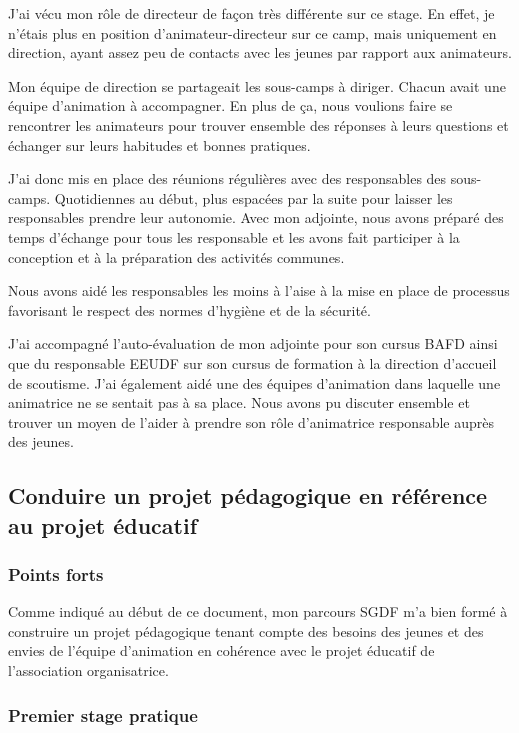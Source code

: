 \documentclass[titlepage,11pt,a4paper]{article}
\begin{document}
J'ai vécu mon rôle de directeur de façon très différente sur ce stage. En effet,
je n'étais plus en position d’animateur-directeur sur ce camp, mais uniquement en
direction, ayant assez peu de contacts avec les jeunes par rapport aux animateurs.

Mon équipe de direction se partageait les sous-camps à diriger. Chacun avait une équipe
d'animation à accompagner. En plus de ça, nous voulions faire se rencontrer les animateurs pour
trouver ensemble des réponses à leurs questions et échanger sur leurs habitudes et bonnes
pratiques.

J'ai donc mis en place des réunions régulières avec des responsables des sous-camps.
Quotidiennes au début, plus espacées par la suite pour laisser les responsables prendre leur autonomie.
Avec mon adjointe, nous avons préparé des temps d'échange pour tous les responsable et les
avons fait participer à la conception et à la préparation des activités communes.

Nous avons aidé les responsables les moins à l'aise à
la mise en place de processus favorisant le respect des normes d'hygiène et de la sécurité.

J'ai accompagné l'auto-évaluation de mon adjointe pour son cursus BAFD ainsi que
du responsable EEUDF sur son cursus de formation à la direction d'accueil de scoutisme. J'ai
également aidé une des équipes d'animation dans laquelle une animatrice ne se
sentait pas à sa place. Nous avons pu discuter ensemble et trouver un moyen de l'aider à
prendre son rôle d'animatrice responsable auprès des jeunes.

\subsection{Conduire un projet pédagogique en référence au projet éducatif}

\subsubsection{Points forts}

Comme indiqué au début de ce document, mon parcours SGDF m'a bien formé à construire
un projet pédagogique tenant compte des besoins des jeunes et des
envies de l'équipe d'animation en cohérence avec le projet éducatif de l'association
organisatrice.

\subsubsection{Premier stage pratique}
\end{document}
